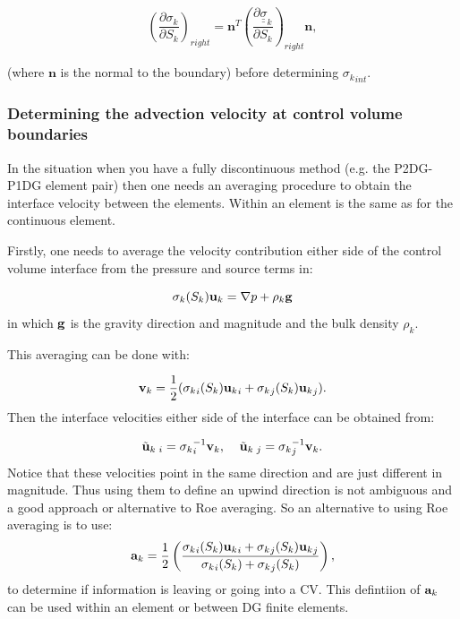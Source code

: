 \begin{equation}
\left({\frac{\partial \sigma_k}{\partial S_k}}\right)_{right} = {\mathbf n}^T 
\left( \frac{\partial {\underline {\underline \sigma}}_k}{\partial S_k}\right)_{right} {\mathbf n}, 
\end{equation}

(where ${\mathbf n}$ is the normal to the boundary) 
before determining ${\sigma_k}_{int}$.  




\subsubsection{Determining the advection velocity at control volume boundaries}  
In the situation when you have a fully discontinuous method (e.g. the P2DG-P1DG element pair) then 
one needs an averaging procedure to obtain the interface velocity between the elements. 
Within an element is the same as for the continuous element.   



Firstly, one needs to average the velocity contribution either side of the control volume 
interface 
from the pressure and source terms in:


\begin{equation}
\sigma_k(S_k){\bf u}_k =  \nabla p + \rho_k {\bf g}
\label{force-o}  
\end{equation} 
in which $\bf g$ is the gravity direction and magnitude and the bulk 
density $\rho_k$. 

This averaging  can be done with: 


\begin{equation}
{{\bf v}}_k = \frac{1}{2} ( {\sigma_k}_i(S_k){{\bf u}_k}_i + {\sigma_k}_j(S_k){{\bf u}_k}_j ) . 
\end{equation} 
Then the interface velocities either side of the interface can be obtained from: 

\begin{equation}
{\tilde{\bf u}_k}\:_i=   {\sigma_k}_i^{-1}  {{\bf v}}_k  , \;\;\;\; 
{\tilde{\bf u}_k}\:_j =  {\sigma_k}_j^{-1}  {{\bf v}}_k    . 
\label{two-vels}
\end{equation} 
Notice that these velocities point in the same direction and are just different in magnitude. 
Thus using them to define an upwind direction is not ambiguous and a good approach or alternative 
to Roe averaging. 
So an alternative to using Roe averaging is to use: 
\begin{equation}
{\bf a}_k= \frac{1}{2} \left( \frac{
 {\sigma_k}_i(S_k){{\bf u}_k}_i + {\sigma_k}_j(S_k){{\bf u}_k}_j 
}
{ {\sigma_k}_i(S_k)+{\sigma_k}_j(S_k)} \right),
\end{equation} 
to determine if information is leaving or going into a CV. This defintiion of ${\bf a}_k$ can be used 
within an element or between DG finite elements. 



